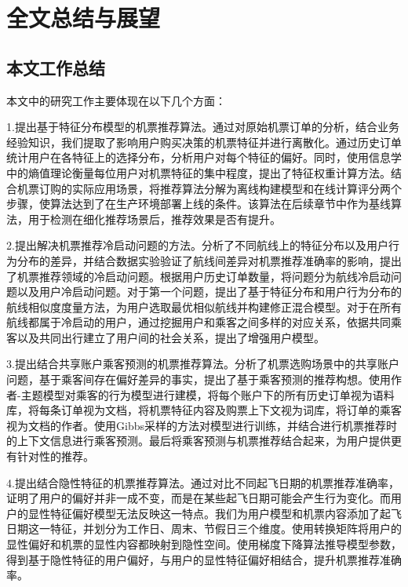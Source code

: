 
\chapter{全文总结与展望}
\label{chap:summary}

\section{本文工作总结}
本文中的研究工作主要体现在以下几个方面：

1.提出基于特征分布模型的机票推荐算法。通过对原始机票订单的分析，结合业务经验知识，我们提取了影响用户购买决策的机票特征并进行离散化。通过历史订单统计用户在各特征上的选择分布，分析用户对每个特征的偏好。同时，使用信息学中的熵值理论衡量每位用户对机票特征的集中程度，提出了特征权重计算方法。结合机票订购的实际应用场景，将推荐算法分解为离线构建模型和在线计算评分两个步骤，使算法达到了在生产环境部署上线的条件。该算法在后续章节中作为基线算法，用于检测在细化推荐场景后，推荐效果是否有提升。

2.提出解决机票推荐冷启动问题的方法。分析了不同航线上的特征分布以及用户行为分布的差异，并结合数据实验验证了航线间差异对机票推荐准确率的影响，提出了机票推荐领域的冷启动问题。根据用户历史订单数量，将问题分为航线冷启动问题以及用户冷启动问题。对于第一个问题，提出了基于特征分布和用户行为分布的航线相似度度量方法，为用户选取最优相似航线并构建修正混合模型。对于在所有航线都属于冷启动的用户，通过挖掘用户和乘客之间多样的对应关系，依据共同乘客以及共同出行建立了用户间的社会关系，提出了增强用户模型。

3.提出结合共享账户乘客预测的机票推荐算法。分析了机票选购场景中的共享账户问题，基于乘客间存在偏好差异的事实，提出了基于乘客预测的推荐构想。使用作者-主题模型对乘客的行为模型进行建模，将每个账户下的所有历史订单视为语料库，将每条订单视为文档，将机票特征内容及购票上下文视为词库，将订单的乘客视为文档的作者。使用Gibbs采样的方法对模型进行训练，并结合进行机票推荐时的上下文信息进行乘客预测。最后将乘客预测与机票推荐结合起来，为用户提供更有针对性的推荐。

4.提出结合隐性特征的机票推荐算法。通过对比不同起飞日期的机票推荐准确率，证明了用户的偏好并非一成不变，而是在某些起飞日期可能会产生行为变化。而用户的显性特征偏好模型无法反映这一特点。我们为用户模型和机票内容添加了起飞日期这一特征，并划分为工作日、周末、节假日三个维度。使用转换矩阵将用户的显性偏好和机票的显性内容都映射到隐性空间。使用梯度下降算法推导模型参数，得到基于隐性特征的用户偏好，与用户的显性特征偏好相结合，提升机票推荐准确率。

